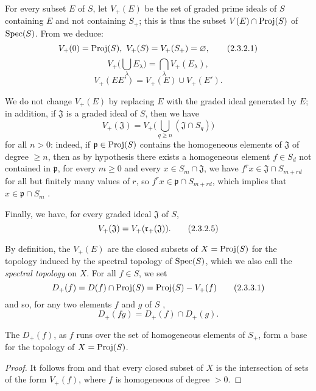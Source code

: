 \begin{env}[2.3.2]
\label{II.2.3.2}
For every subset $E$ of $S$, let $V_+(E)$ be the set of graded prime ideals of $S$ containing $E$ and not containing $S_+$;
this is thus the subset $V(E)\cap\operatorname{Proj}(S)$ of $\operatorname{Spec}(S)$.
From  we deduce:
\[
\label{II.2.3.2.1}
  V_+(0)=\operatorname{Proj}(S),\ V_+(S)=V_+(S_+)=\varnothing,
\tag{2.3.2.1}
\]
\[
\label{II.2.3.2.2}
  V_+\big(\textstyle\bigcup_\lambda E_\lambda\big)=\textstyle\bigcap_\lambda V_+(E_\lambda),
\tag{2.3.2.2}
\]
\[
\label{II.2.3.2.3}
  V_+(EE')=V_+(E)\cup V_+(E').
\tag{2.3.2.3}
\]

We do not change $V_+(E)$ by replacing $E$ with the graded ideal generated by $E$;
in addition, if $\mathfrak{J}$ is a graded ideal of $S$, then we have
\[
  V_+(\mathfrak{J})=V_+\big(\textstyle\bigcup_{q\geq n}(\mathfrak{J}\cap S_q)\big)
\tag{2.3.2.4}
\]
for all $n>0$: indeed, if $\mathfrak{p}\in\operatorname{Proj}(S)$ contains the homogeneous elements of $\mathfrak{J}$ of degree $\geq n$, then as by hypothesis there exists a homogeneous element $f\in S_d$ not contained in $\mathfrak{p}$, for every $m\geq 0$ and every $x\in S_m\cap\mathfrak{J}$, we have $f^r x\in\mathfrak{J}\cap S_{m+rd}$ for all but finitely many values of $r$, so $f^r x\in\mathfrak{p}\cap S_{m+rd}$, which implies that $x\in\mathfrak{p}\cap S_m$ .

Finally, we have, for every graded ideal $\mathfrak{J}$ of $S$,
\[
  V_+(\mathfrak{J})=V_+(\mathfrak{r}_+(\mathfrak{J})).
\tag{2.3.2.5}
\]
\end{env}

\begin{env}[2.3.3]
\label{II.2.3.3}
By definition, the $V_+(E)$ are the closed subsets of $X=\operatorname{Proj}(S)$ for the topology induced by the spectral topology of $\operatorname{Spec}(S)$, which we also call the \emph{spectral topology} on $X$.
For all $f\in S$, we set
\[
\label{II.2.3.3.1}
  D_+(f) = D(f)\cap\operatorname{Proj}(S) = \operatorname{Proj}(S)- V_+(f)
\tag{2.3.3.1}
\]
and so, for any two elements $f$ and $g$ of $S$ ,
\[
\label{II.2.3.3.2}
  D_+(fg) = D_+(f)\cap D_+(g).
\tag{2.3.3.2}
\]
\end{env}

\begin{proposition}[2.3.4]
\label{II.2.3.4}
The $D_+(f)$, as $f$ runs over the set of homogeneous elements of $S_+$, form a base for the topology of $X=\operatorname{Proj}(S)$.
\end{proposition}

\begin{proof}
It follows from  and  that every closed subset of $X$ is the intersection of sets of the form $V_+(f)$, where $f$ is homogeneous of degree $>0$.
\end{proof}

